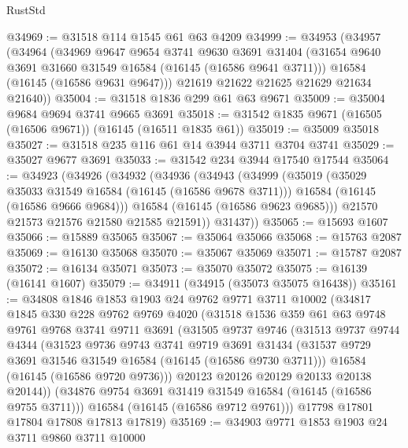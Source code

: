 \begin{lexlean}{RustStd}
\begin{coremodule}
@34969 := @31518 @114 @1545 @61 @63 @4209
@34999 := @34953
    (@34957
      (@34964
        (@34969
          @9647
          @9654
          @3741
          @9630
          @3691
          @31404
          (@31654 @9640 @3691 @31660 @31549 @16584 (@16145 (@16586 @9641 @3711)))
          @16584
          (@16145 (@16586 @9631 @9647)))
        @21619
        @21622
        @21625
        @21629
        @21634
        @21640))
@35004 := @31518 @1836 @299 @61 @63 @9671
@35009 := @35004 @9684 @9694 @3741 @9665 @3691
@35018 := @31542 @1835 @9671 (@16505 (@16506 @9671)) (@16145 (@16511 @1835 @61))
@35019 := @35009 @35018
@35027 := @31518 @235 @116 @61 @14 @3944 @3711 @3704 @3741
@35029 := @35027 @9677 @3691
@35033 := @31542 @234 @3944 @17540 @17544
@35064 := @34923
    (@34926
      (@34932
        (@34936
          (@34943
            (@34999
              (@35019
                (@35029 @35033 @31549 @16584 (@16145 (@16586 @9678 @3711)))
                @16584
                (@16145 (@16586 @9666 @9684)))
              @16584
              (@16145 (@16586 @9623 @9685)))
            @21570
            @21573
            @21576
            @21580
            @21585
            @21591))
        @31437))
@35065 := @15693 @1607
@35066 := @15889 @35065
@35067 := @35064 @35066
@35068 := @15763 @2087
@35069 := @16130 @35068
@35070 := @35067 @35069
@35071 := @15787 @2087
@35072 := @16134 @35071
@35073 := @35070 @35072
@35075 := @16139 (@16141 @1607)
@35079 := @34911 (@34915 (@35073 @35075 @16438))
@35161 := @34808
    @1846
    @1853
    @1903
    @24
    @9762
    @9771
    @3711
    @10002
    (@34817
      @1845
      @330
      @228
      @9762
      @9769
      @4020
      (@31518
        @1536
        @359
        @61
        @63
        @9748
        @9761
        @9768
        @3741
        @9711
        @3691
        (@31505
          @9737
          @9746
          (@31513
            @9737
            @9744
            @4344
            (@31523
              @9736
              @9743
              @3741
              @9719
              @3691
              @31434
              (@31537 @9729 @3691 @31546 @31549 @16584 (@16145 (@16586 @9730 @3711)))
              @16584
              (@16145 (@16586 @9720 @9736)))
            @20123
            @20126
            @20129
            @20133
            @20138
            @20144))
        (@34876 @9754 @3691 @31419 @31549 @16584 (@16145 (@16586 @9755 @3711)))
        @16584
        (@16145 (@16586 @9712 @9761)))
      @17798
      @17801
      @17804
      @17808
      @17813
      @17819)
@35169 := @34903 @9771 @1853 @1903 @24 @3711 @9860 @3711 @10000

\end{coremodule}
\end{lexlean}

